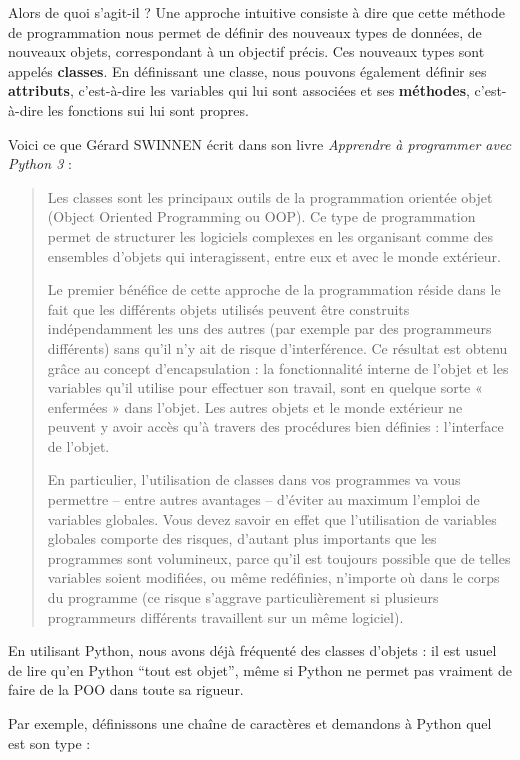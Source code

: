\documentclass[
  letterpaper,
  DIV=11,
  numbers=noendperiod]{scrartcl}
\begin{document}
Alors de quoi s'agit-il ? Une approche intuitive consiste à dire que
cette méthode de programmation nous permet de définir des nouveaux types
de données, de nouveaux objets, correspondant à un objectif précis. Ces
nouveaux types sont appelés \textbf{classes}. En définissant une classe,
nous pouvons également définir ses \textbf{attributs}, c'est-à-dire les
variables qui lui sont associées et ses \textbf{méthodes}, c'est-à-dire
les fonctions sui lui sont propres.

Voici ce que Gérard SWINNEN écrit dans son livre \emph{Apprendre à
programmer avec Python 3} :

\begin{quote}
Les classes sont les principaux outils de la programmation orientée
objet (Object Oriented Programming ou OOP). Ce type de programmation
permet de structurer les logiciels complexes en les organisant comme des
ensembles d'objets qui interagissent, entre eux et avec le monde
extérieur.

Le premier bénéfice de cette approche de la programmation réside dans le
fait que les différents objets utilisés peuvent être construits
indépendamment les uns des autres (par exemple par des programmeurs
différents) sans qu'il n'y ait de risque d'interférence. Ce résultat est
obtenu grâce au concept d'encapsulation : la fonctionnalité interne de
l'objet et les variables qu'il utilise pour effectuer son travail, sont
en quelque sorte « enfermées » dans l'objet. Les autres objets et le
monde extérieur ne peuvent y avoir accès qu'à travers des procédures
bien définies : l'interface de l'objet.

En particulier, l'utilisation de classes dans vos programmes va vous
permettre -- entre autres avantages -- d'éviter au maximum l'emploi de
variables globales. Vous devez savoir en effet que l'utilisation de
variables globales comporte des risques, d'autant plus importants que
les programmes sont volumineux, parce qu'il est toujours possible que de
telles variables soient modifiées, ou même redéfinies, n'importe où dans
le corps du programme (ce risque s'aggrave particulièrement si plusieurs
programmeurs différents travaillent sur un même logiciel).
\end{quote}

En utilisant Python, nous avons déjà fréquenté des classes d'objets : il
est usuel de lire qu'en Python ``tout est objet'', même si Python ne
permet pas vraiment de faire de la POO dans toute sa rigueur.

Par exemple, définissons une chaîne de caractères et demandons à Python
quel est son type :
\end{document}
